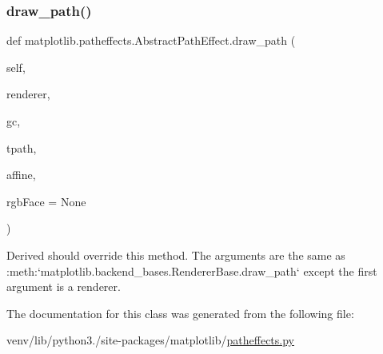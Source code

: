 \subsubsection{\texorpdfstring{draw\+\_\+path()}{draw\_path()}}
{\footnotesize\ttfamily def matplotlib.\+patheffects.\+Abstract\+Path\+Effect.\+draw\+\_\+path (\begin{DoxyParamCaption}\item[{}]{self,  }\item[{}]{renderer,  }\item[{}]{gc,  }\item[{}]{tpath,  }\item[{}]{affine,  }\item[{}]{rgb\+Face = {\ttfamily None} }\end{DoxyParamCaption})}

\begin{DoxyVerb}Derived should override this method. The arguments are the same
as :meth:`matplotlib.backend_bases.RendererBase.draw_path`
except the first argument is a renderer.
\end{DoxyVerb}
 

The documentation for this class was generated from the following file\+:\begin{DoxyCompactItemize}
\item 
venv/lib/python3./site-\/packages/matplotlib/\hyperlink{patheffects_8py}{patheffects.\+py}\end{DoxyCompactItemize}
